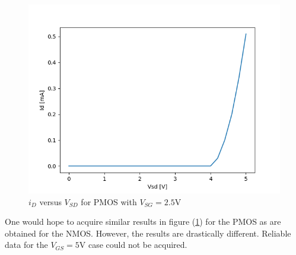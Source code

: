 
\FloatBarrier

\begin{figure}[h!]
	\centering
	\includegraphics[scale=0.75]{../images/data_4.PNG}
	\caption{$i_{D}$ versus $V_{SD}$ for PMOS with $V_{SG} = 2.5$\si{\volt}}
	\label{fig:data_4}
\end{figure}

\FloatBarrier

One would hope to acquire similar results in figure (\ref{fig:data_4}) for the PMOS as are obtained for the NMOS.
However, the results are drastically different.
Reliable data for the $V_{GS} = 5$\si{\volt} case could not be acquired.
